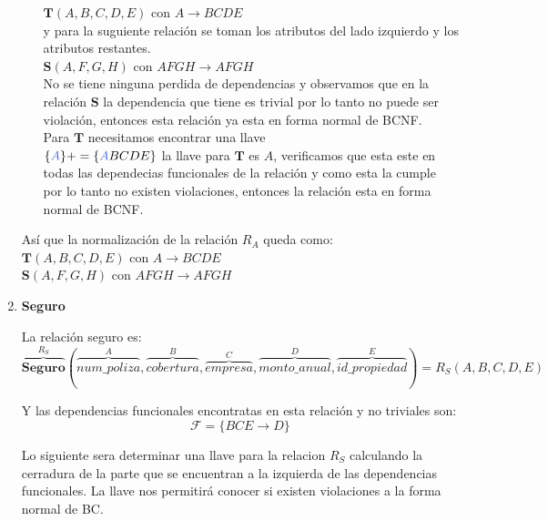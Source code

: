 \documentclass[10pt]{article}
\begin{document}
\begin{enumerate}
\begin{itemize}
   	$\textbf{T}(A,B,C,D,E)$ con $A \rightarrow BCDE$\\
   	
   	y para la suguiente relación se toman los atributos del lado izquierdo y los atributos restantes.\\
   	
   	$\textbf{S}(A,F,G,H)$ con $AFGH \rightarrow AFGH$\\ 
   	
   	No se tiene ninguna perdida de dependencias y observamos que en la relación
   	$\textbf{S}$ la dependencia que tiene es trivial por lo tanto no puede ser violación, entonces esta relación ya esta en forma normal de BCNF. \\
   	Para $\textbf{T}$  necesitamos encontrar una llave\\
   	$\{\textcolor{RoyalBlue}{A}\}+= \{\textcolor{RoyalBlue}{A}BCDE\}$ la llave para $\textbf{T}$ es $A$, verificamos que esta este en todas las dependecias funcionales de la relación y como esta la cumple por lo tanto no existen violaciones, entonces la relación esta en forma normal de BCNF.\\
   \end{itemize}
   
    Así que la normalización de la relación $R_A$ queda como:\\
    
     	$\textbf{T}(A,B,C,D,E)$ con $A \rightarrow BCDE$\\   
    $\textbf{S}(A,F,G,H)$ con $AFGH \rightarrow AFGH$\\ 
    
    
    	
    	 
    	\item \textbf{Seguro}
    	
    	La relación seguro es:
    	\[\overbrace{{\textbf{Seguro}}}^{\textbf{$R_{S}$}} 
    	(
    	\overbrace{num\_poliza}^{A}, \overbrace{cobertura}^{B},
    	\overbrace{empresa}^{C}, \overbrace{monto\_anual}^{D}, \overbrace{id\_propiedad}^{E}
    	)
    	= 
    	\textbf{$R_S$}(A,B,C,D,E)
    	\]
    	
    	Y las dependencias funcionales encontratas en esta relación  y no triviales son:\\
    	\[\mathcal{F} = \{BCE \rightarrow D\}\]
    	
    	Lo siguiente sera determinar una llave para la relacion $R_S$ calculando la cerradura de la parte que se encuentran a la izquierda de las dependencias funcionales. La llave nos permitirá conocer si existen violaciones a la forma normal de BC.\\
    	

\end{enumerate}
\end{document}

